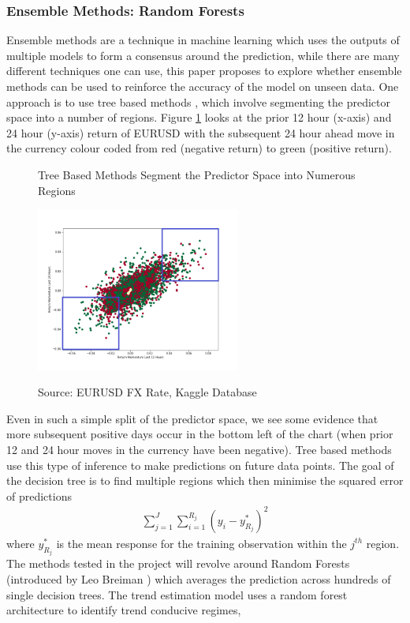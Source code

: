 \documentclass[11pt]{article}
\begin{document}
\subsubsection{Ensemble Methods: Random Forests}
Ensemble methods are a technique in machine learning which uses the outputs of multiple models to form a consensus around the prediction, while there are many different techniques one can use, this paper proposes to explore whether ensemble methods can be used to reinforce the accuracy of the model on unseen data. One approach is to use tree based methods \cite{Podgorelec2015}, which involve segmenting the predictor space into a number of regions.  Figure \ref{fig:EURUSDMomentum} looks at the prior 12 hour (x-axis) and 24 hour (y-axis) return of EURUSD with the subsequent 24 hour ahead move in the currency colour coded from red (negative return) to green (positive return). 
\begin{figure}[h]
    \centering
	\caption{Tree Based Methods Segment the Predictor Space into Numerous Regions}    
	\includegraphics[width=0.6\textwidth]{EURUSDMomentum}
    \label{fig:EURUSDMomentum}
     \caption*{\small Source: EURUSD FX Rate, Kaggle Database}
\end{figure}
Even in such a simple split of the predictor space, we see some evidence that more subsequent positive days occur in the bottom left of the chart (when prior 12 and 24 hour moves in the currency have been negative). Tree based methods use this type of inference to make predictions on future data points. The goal of the decision tree is to find multiple regions which then minimise the squared error of predictions
\begin{align}
\sum^{J}_{j = 1}\sum^{R_{j}}_{i = 1} (y_{i}-y^{*}_{R_{j}})^{2} 
\end{align}
 where $y^{*}_{R_{j}}$ is the mean response for the training observation within the $j^{th}$ region.
The methods tested in the project will revolve around Random Forests (introduced by Leo Breiman \cite{Breiman2001}) which averages the prediction across hundreds of single decision trees. The trend estimation model uses a random forest architecture to identify trend conducive regimes,
\end{document}
